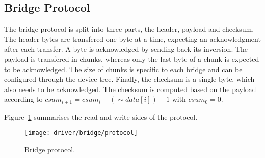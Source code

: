 	\subsection{Bridge Protocol}
		The bridge protocol is split into three parts, the header, payload and checksum. The header bytes are transfered one byte at a time, expecting an acknowledgment after each transfer. A byte is acknowledged by sending back its inversion. The payload is transfered in chunks, whereas only the last byte of a chunk is expected to be acknowledged. The size of chunks is specific to each bridge and can be configured through the device tree. Finally, the checksum is a single byte, which also needs to be acknowledged. The checksum is computed based on the payload according to $csum_{i + 1} = csum_i + (\sim data[i]) + 1$ with $csum_0 = 0$.

		Figure~\ref{fig:brdg_protocol} summarises the read and write sides of the protocol.

		\begin{figure}[h]
			\centering	
			\texttt{[image: driver/bridge/protocol]}
			\caption{Bridge protocol.}
			\label{fig:brdg_protocol}
		\end{figure}
